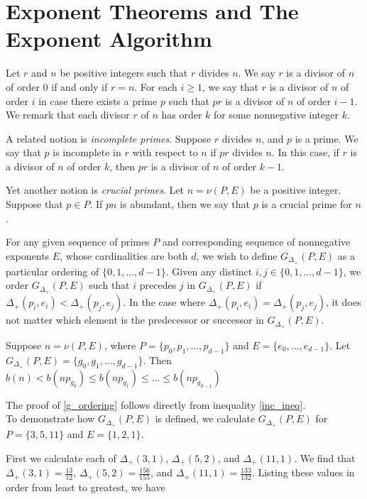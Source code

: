 \documentclass[../paper.tex]{subfiles}
\begin{document}
\section{Exponent Theorems and The Exponent Algorithm}

Let $r$ and $n$ be positive integers such that $r$ divides $n$. We
say $r$ is a divisor of $n$ of order $0$ if and only if $r = n$.
For each $i \geq 1$, we say that $r$ is a divisor of $n$ of order
$i$ in case there exists a prime $p$ such that $pr$ is a divisor
of $n$ of order $i - 1$. We remark that each divisor $r$ of $n$ has
order $k$ for some nonnegative integer $k$.

A related notion is \textit{incomplete primes}. Suppose $r$ divides 
$n$, and $p$ is a prime. We say that $p$ is incomplete in $r$ with 
respect to $n$ if $pr$ divides $n$. In this case, if $r$ is a divisor 
of $n$ of order $k$, then $pr$ is a divisor of $n$ of order $k - 1$.

Yet another notion is \textit{crucial primes}. Let $n = \nu (P,E)$ 
be a positive integer. Suppose that $p \in P$. If $pn$ is
abundant, then we say that $p$ is a crucial prime for $n$. 

For any given sequence of primes $P$ and corresponding sequence of
nonnegative exponents $E$, whose cardinalities are both $d$, we
wish to define $G_{\Delta_+}(P,E)$ as a particular ordering of
$\{0, 1, ..., d-1\}$. Given any distinct $i,j \in \{0, 1, ..., 
d - 1\}$, we order $G_{\Delta_+}(P, E)$ such that $i$ precedes 
$j$ in $G_{\Delta_+}(P, E)$ if $\Delta_+(p_i, e_i) < 
\Delta_+(p_j, e_j)$. In the case where  $\Delta_+(p_i, e_i) =
\Delta_+(p_j, e_j)$, it does not matter which element is the
predecessor or successor in $G_{\Delta_+}(P,E)$.

\begin{theorem}\label{g_ordering}
Suppose $n = \nu(P, E)$, where $P = \{p_0, p_1, ..., p_{d-1}\}$
and $E = \{e_0, ..., e_{d-1}\}$. Let $G_{\Delta_+}(P,E) = \{g_0, 
g_1, ..., g_{d-1}\}$. Then $b(n) < b(n p_{g_0}) \leq b(n p_{g_1})
\leq ... \leq b(n p_{g_{d-1}})$
\end{theorem}

The proof of {\ref{g_ordering}} follows directly from inequality
\ref{inc_ineq}.
\\
To demonstrate how $G_{\Delta_+}(P,E)$ is defined, we calculate
$G_{\Delta_+}(P,E)$ for $P = \{3, 5, 11\}$ and $E = \{1, 2, 1\}$.


First we calculate each of $\Delta_{+}(3,1)$, $\Delta_{+}(5,2)$, 
and $\Delta_{+}(11,1)$. We find that 
$\Delta_{+}(3,1) = \frac{13}{12}$,
$\Delta_{+}(5,2) = \frac{156}{155}$, and
$\Delta_{+}(11,1)= \frac{133}{132}$.
Listing these values in order from least to greatest, we have
\end{document}
